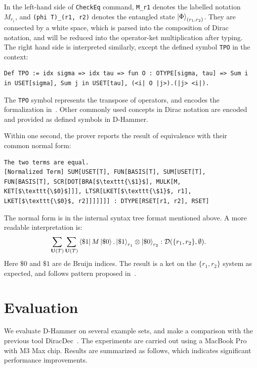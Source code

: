 In the left-hand side of \texttt{\textcolor{NavyBlue}{CheckEq}} command, \texttt{M\_r1} denotes the labelled notation $M_{r_1}$, and \texttt{(phi T)\_(r1, r2)} denotes the entangled state $\ket{\Phi}_{(r_1, r_2)}$. They are connected by a white space, which is parsed into the composition of Dirac notation, and will be reduced into the operator-ket multiplication after typing. The right hand side is interpreted similarly, except the defined symbol \texttt{TPO} in the context:

\begin{lstlisting}[style=dhammer]
Def TPO := idx sigma => idx tau => fun O : OTYPE[sigma, tau] => Sum i in USET[sigma], Sum j in USET[tau], (<i| O |j>).(|j> <i|).
\end{lstlisting}

The \texttt{TPO} symbol represents the transpose of operators, and encodes the formalization in~. Other commonly used concepts in Dirac notation are encoded and provided as defined symbols in D-Hammer.

Within one second, the prover reports the result of equivalence with their common normal form:
    \begin{lstlisting}[style=dhammer]
The two terms are equal.
[Normalized Term] SUM[USET[T], FUN[BASIS[T], SUM[USET[T], FUN[BASIS[T], SCR[DOT[BRA[$\texttt{\$1}$], MULK[M, KET[$\texttt{\$0}$]]], LTSR[LKET[$\texttt{\$1}$, r1], LKET[$\texttt{\$0}$, r2]]]]]]] : DTYPE[RSET[r1, r2], RSET]
    \end{lstlisting}

The normal form is in the internal syntax tree format mentioned above. A more readable interpretation is:
\[
\sum_{\mathbf{U}(T)} \sum_{\mathbf{U}(T)} \bra{\$1}M\ket{\$ 0} . \ket{\$1}_{r_1} \otimes \ket{\$0}_{r_2} : \mathcal{D}(\{r_1, r_2\}, \emptyset).
\]
Here $\$0$ and $\$1$ are de Bruijn indices. The result is a ket on the $\{r_1, r_2\}$ system as expected, and follows pattern proposed in~.



\section{Evaluation}\label{sec:eval}
We evaluate D-Hammer on several example sets, and make a comparison with the previous tool DiracDec~\cite{diracdec}.
The experiments are carried out using a MacBook Pro with M3 Max chip. Results are summarized as follows, which indicates
significant performance improvements.

